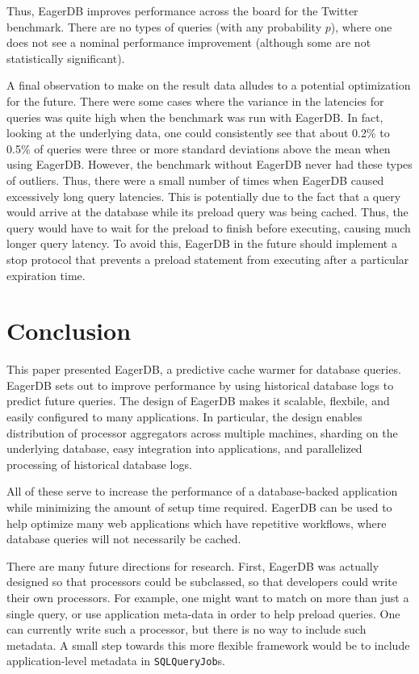 \documentclass[12pt]{article}
\begin{document}
Thus, EagerDB improves performance across the board for the Twitter benchmark. There are no types of queries (with any probability $p$), where one does not see a nominal performance improvement (although some are not statistically significant).

A final observation to make on the result data alludes to a potential optimization for the future. There were some cases where the variance in the latencies for queries was quite high when the benchmark was run with EagerDB. In fact, looking at the underlying data, one could consistently see that about 0.2\% to 0.5\% of queries were three or more standard deviations above the mean when using EagerDB. However, the benchmark without EagerDB never had these types of outliers. Thus, there were a small number of times when EagerDB caused excessively long query latencies. This is potentially due to the fact that a query would arrive at the database while its preload query was being cached. Thus, the query would have to wait for the preload to finish before executing, causing much longer query latency. To avoid this, EagerDB in the future should implement a stop protocol that prevents a preload statement from executing after a particular expiration time.

\section{Conclusion}

This paper presented EagerDB, a predictive cache warmer for database queries. EagerDB sets out to improve performance by using historical database logs to predict future queries. The design of EagerDB makes it scalable, flexbile, and easily configured to many applications. In particular, the design enables distribution of processor aggregators across multiple machines, sharding on the underlying database, easy integration into applications, and parallelized processing of historical database logs.

All of these serve to increase the performance of a database-backed application while minimizing the amount of setup time required. EagerDB can be used to help optimize many web applications which have repetitive workflows, where database queries will not necessarily be cached.

There are many future directions for research. First, EagerDB was actually designed so that processors could be subclassed, so that developers could write their own processors. For example, one might want to match on more than just a single query, or use application meta-data in order to help preload queries. One can currently write such a processor, but there is no way to include such metadata. A small step towards this more flexible framework would be to include application-level metadata in \texttt{SQLQueryJob}s.
\end{document}
